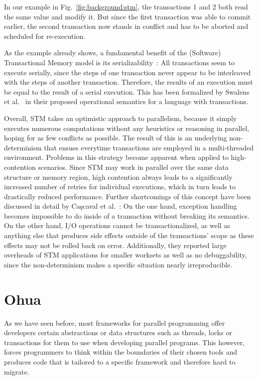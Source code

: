 In our example in Fig.~\ref{fig:background:stm}, the transactions 1 and 2 both read the same value and modify it.
But since the first transaction was able to commit earlier, the second transaction now stands in conflict and has to be aborted and scheduled for re-execution.

As the example already shows, a fundamental benefit of the (Software) Transactional Memory model is its serializability~\cite{swalens2016transactional}:
All transactions seem to execute serially, since the steps of one transaction never appear to be interleaved with the steps of another transaction.
Therefore, the results of an execution must be equal to the result of a serial execution.
This has been formalized by Swalens et al.~\cite{swalens2016transactional} in their proposed operational semantics for a language with transactions.

Overall, STM takes an optimistic approach to parallelism, because it simply executes numerous computations without any heuristics or reasoning in parallel, hoping for as few conflicts as possible.
The result of this is an underlying non-determinism that ensues everytime transactions are employed in a multi-threaded environment.
Problems in this strategy become apparent when applied to high-contention scenarios.
Since STM may work in parallel over the same data structure or memory region, high contention always leads to a significantly increased number of retries for individual executions, which in turn leads to drastically reduced performance.
Further shortcomings of this concept have been discussed in detail by Caşcaval et al.~\cite{cascaval2008software}:
On the one hand, exception handling becomes impossible to do inside of a transaction without breaking its semantics.
On the other hand, I/O operations cannot be transactionalized, as well as anything else that produces side effects outside of the transactions' scope as these effects may not be rolled back on error.
Additionally, they reported large overheads of STM applications for smaller worksets as well as no debuggability, since the non-determinism makes a specific situation nearly irreproducible.


\section{Ohua}
\label{sec:background:ohua}

As we have seen before, most frameworks for parallel programming offer developers certain abstractions or data structures such as threads, locks or transactions for them to use when developing parallel programs.
This however, forces programmers to think within the boundaries of their chosen tools and produces code that is tailored to a specific framework and therefore hard to migrate.

